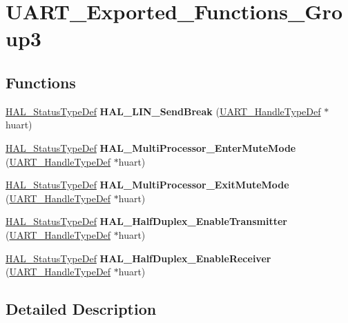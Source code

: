\hypertarget{group___u_a_r_t___exported___functions___group3}{}\section{U\+A\+R\+T\+\_\+\+Exported\+\_\+\+Functions\+\_\+\+Group3}
\label{group___u_a_r_t___exported___functions___group3}
\subsection*{Functions}
\begin{DoxyCompactItemize}
\item 
\mbox{\label{group___u_a_r_t___exported___functions___group3_gaffbf11fb4929f709004a11675cd25fcf}} 
\hyperlink{stm32f1xx__hal__def_8h_a63c0679d1cb8b8c684fbb0632743478f}{H\+A\+L\+\_\+\+Status\+Type\+Def} {\bfseries H\+A\+L\+\_\+\+L\+I\+N\+\_\+\+Send\+Break} (\hyperlink{struct_u_a_r_t___handle_type_def}{U\+A\+R\+T\+\_\+\+Handle\+Type\+Def} $\ast$huart)
\item 
\mbox{\label{group___u_a_r_t___exported___functions___group3_ga659637545299b91d2a77dadaf7266bf2}} 
\hyperlink{stm32f1xx__hal__def_8h_a63c0679d1cb8b8c684fbb0632743478f}{H\+A\+L\+\_\+\+Status\+Type\+Def} {\bfseries H\+A\+L\+\_\+\+Multi\+Processor\+\_\+\+Enter\+Mute\+Mode} (\hyperlink{struct_u_a_r_t___handle_type_def}{U\+A\+R\+T\+\_\+\+Handle\+Type\+Def} $\ast$huart)
\item 
\mbox{\label{group___u_a_r_t___exported___functions___group3_ga81b90fb3a4d7a8601a92260edbd3422f}} 
\hyperlink{stm32f1xx__hal__def_8h_a63c0679d1cb8b8c684fbb0632743478f}{H\+A\+L\+\_\+\+Status\+Type\+Def} {\bfseries H\+A\+L\+\_\+\+Multi\+Processor\+\_\+\+Exit\+Mute\+Mode} (\hyperlink{struct_u_a_r_t___handle_type_def}{U\+A\+R\+T\+\_\+\+Handle\+Type\+Def} $\ast$huart)
\item 
\mbox{\label{group___u_a_r_t___exported___functions___group3_ga58d73e260a5536fb9cb40d7d2fe2b4bb}} 
\hyperlink{stm32f1xx__hal__def_8h_a63c0679d1cb8b8c684fbb0632743478f}{H\+A\+L\+\_\+\+Status\+Type\+Def} {\bfseries H\+A\+L\+\_\+\+Half\+Duplex\+\_\+\+Enable\+Transmitter} (\hyperlink{struct_u_a_r_t___handle_type_def}{U\+A\+R\+T\+\_\+\+Handle\+Type\+Def} $\ast$huart)
\item 
\mbox{\label{group___u_a_r_t___exported___functions___group3_ga396ebbcdbe352c3393ad3007614383ac}} 
\hyperlink{stm32f1xx__hal__def_8h_a63c0679d1cb8b8c684fbb0632743478f}{H\+A\+L\+\_\+\+Status\+Type\+Def} {\bfseries H\+A\+L\+\_\+\+Half\+Duplex\+\_\+\+Enable\+Receiver} (\hyperlink{struct_u_a_r_t___handle_type_def}{U\+A\+R\+T\+\_\+\+Handle\+Type\+Def} $\ast$huart)
\end{DoxyCompactItemize}


\subsection{Detailed Description}
